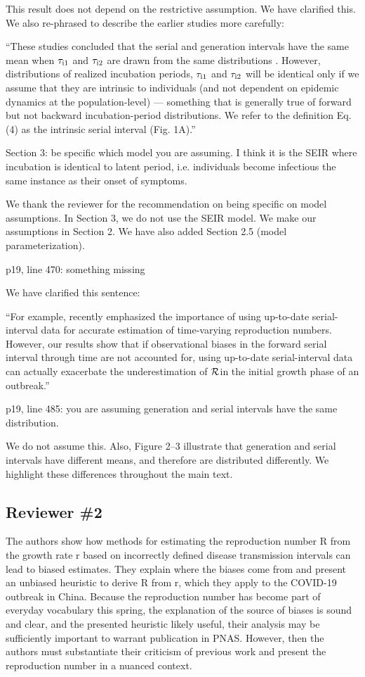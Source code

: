 \documentclass[12pt]{article}
\newcommand{\RR}{\ensuremath{{\cal R}}}
\newcommand{\rev}{\subsection*}
\newcommand{\revtext}{\textsf}
\begin{document}
This result does not depend on the restrictive assumption. We have clarified this. We also re-phrased to describe the earlier studies more carefully:

``These studies concluded that the serial and generation intervals have the same mean when $\tau_{\rm i1}$ and $\tau_{\rm i2}$ are drawn from the same distributions \citep{svensson2007note,klinkenberg2011correlation,champredon2018equivalence, britton2019estimation}.
However, distributions of realized incubation periods, $\tau_{\rm i1}$ and $\tau_{\rm i2}$ will be identical only if we assume that they are intrinsic to individuals (and not dependent on epidemic dynamics at the population-level) ---
something that is generally true of forward but not backward incubation-period distributions.
We refer to the definition Eq. (4) as the intrinsic serial interval (Fig. 1A).''

\revtext{Section 3: be specific which model you are assuming. I think it is the SEIR where incubation is identical to latent period, i.e. individuals become infectious the same instance as their onset of symptoms.}

We thank the reviewer for the recommendation on being specific on model assumptions. In Section 3, we do not use the SEIR model. We make our assumptions in Section 2. We have also added Section 2.5 (model parameterization).

\revtext{p19, line 470: something missing}

We have clarified this sentence:

``For example, \cite{thompson2019improved} recently emphasized the importance of using up-to-date serial-interval data for accurate estimation of time-varying reproduction numbers.
However, our results show that if observational biases in the forward serial interval through time are not accounted for, using up-to-date serial-interval data can actually exacerbate the underestimation of \RR in the initial growth phase of an outbreak.''

\revtext{p19, line 485: you are assuming generation and serial intervals have the same distribution.}

We do not assume this. Also, Figure 2--3 illustrate that generation and serial intervals have different means, and therefore are distributed differently. We highlight these differences throughout the main text.

\rev{Reviewer \#2}

\revtext{The authors show how methods for estimating the reproduction number R from the growth rate r based on incorrectly defined disease transmission intervals can lead to biased estimates. They explain where the biases come from and present an unbiased heuristic to derive R from r, which they apply to the COVID-19 outbreak in China. Because the reproduction number has become part of everyday vocabulary this spring, the explanation of the source of biases is sound and clear, and the presented heuristic likely useful, their analysis may be sufficiently important to warrant publication in PNAS. However, then the authors must substantiate their criticism of previous work and present the reproduction number in a nuanced context.}
\end{document}
